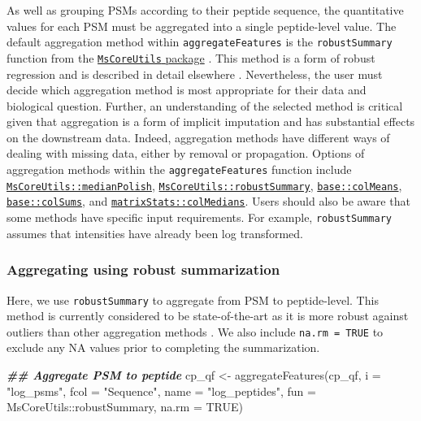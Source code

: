 \documentclass[9pt,a4paper,]{extarticle}
\newenvironment{Shaded}{\begin{snugshade}}{\end{snugshade}}
\newcommand{\AttributeTok}[1]{\textcolor[rgb]{0.77,0.63,0.00}{#1}}
\newcommand{\ConstantTok}[1]{\textcolor[rgb]{0.00,0.00,0.00}{#1}}
\newcommand{\DocumentationTok}[1]{\textcolor[rgb]{0.56,0.35,0.01}{\textbf{\textit{#1}}}}
\newcommand{\FunctionTok}[1]{\textcolor[rgb]{0.00,0.00,0.00}{#1}}
\newcommand{\NormalTok}[1]{#1}
\newcommand{\OtherTok}[1]{\textcolor[rgb]{0.56,0.35,0.01}{#1}}
\newcommand{\SpecialCharTok}[1]{\textcolor[rgb]{0.00,0.00,0.00}{#1}}
\newcommand{\StringTok}[1]{\textcolor[rgb]{0.31,0.60,0.02}{#1}}
\begin{document}
As well as grouping PSMs according to their peptide sequence, the quantitative
values for each PSM must be aggregated into a single peptide-level value. The
default aggregation method within \texttt{aggregateFeatures} is the \texttt{robustSummary}
function from the
\href{https://bioconductor.org/packages/release/bioc/html/MsCoreUtils.html}{\texttt{MsCoreUtils} package}
\citep{Rainer2022}. This method is a form of robust regression and is described in
detail elsewhere \citep{Sticker2020}. Nevertheless, the user must decide which
aggregation method is most appropriate for their data and biological question.
Further, an understanding of the selected method is critical given that
aggregation is a form of implicit imputation and has substantial effects on the
downstream data. Indeed, aggregation methods have different ways of dealing with
missing data, either by removal or propagation. Options of aggregation methods
within the \texttt{aggregateFeatures} function include
\href{https://rdrr.io/bioc/MsCoreUtils/man/medianPolish.html}{\texttt{MsCoreUtils::medianPolish}},
\href{https://rdrr.io/bioc/MsCoreUtils/man/robustSummary.html}{\texttt{MsCoreUtils::robustSummary}},
\href{https://www.rdocumentation.org/packages/base/versions/3.6.2/topics/colSums}{\texttt{base::colMeans}},
\href{https://www.rdocumentation.org/packages/base/versions/3.6.2/topics/colSums}{\texttt{base::colSums}},
and \href{https://rdrr.io/rforge/matrixStats/man/rowMedians.html}{\texttt{matrixStats::colMedians}}.
Users should also be aware that some methods have specific input requirements.
For example, \texttt{robustSummary} assumes that intensities have already been log
transformed.

\hypertarget{aggregating-using-robust-summarization}{%
\subsubsection{Aggregating using robust summarization}\label{aggregating-using-robust-summarization}}

Here, we use \texttt{robustSummary} to aggregate from PSM to peptide-level. This method
is currently considered to be state-of-the-art as it is more robust against
outliers than other aggregation methods \citep{Sticker2020, Goeminne2016}. We also
include \texttt{na.rm\ =\ TRUE} to exclude any NA values prior to completing the
summarization.

\begin{Shaded}
\begin{Highlighting}[]
\DocumentationTok{\#\# Aggregate PSM to peptide}
\NormalTok{cp\_qf }\OtherTok{\textless{}{-}} \FunctionTok{aggregateFeatures}\NormalTok{(cp\_qf,}
                           \AttributeTok{i =} \StringTok{"log\_psms"}\NormalTok{,}
                           \AttributeTok{fcol =} \StringTok{"Sequence"}\NormalTok{,}
                           \AttributeTok{name =} \StringTok{"log\_peptides"}\NormalTok{,}
                           \AttributeTok{fun =}\NormalTok{ MsCoreUtils}\SpecialCharTok{::}\NormalTok{robustSummary,}
                           \AttributeTok{na.rm =} \ConstantTok{TRUE}\NormalTok{)}
\end{Highlighting}
\end{Shaded}
\end{document}
